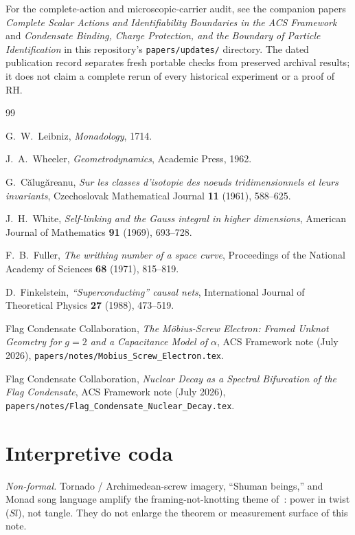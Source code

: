 \documentclass[11pt,a4paper]{article}
\theoremstyle{definition}
\theoremstyle{remark}
\begin{document}
For the complete-action and microscopic-carrier audit, see the companion
papers \emph{Complete Scalar Actions and Identifiability Boundaries in the ACS
Framework} and \emph{Condensate Binding, Charge Protection, and the Boundary
of Particle Identification} in this repository's \texttt{papers/updates/}
directory. The dated publication record separates fresh portable checks
from preserved archival results; it does not claim a complete rerun of every
historical experiment or a proof of RH.

\begin{thebibliography}{99}

G.~W.~Leibniz,
\textit{Monadology},
1714.

J.~A.~Wheeler,
\textit{Geometrodynamics},
Academic Press, 1962.

G.~C\u{a}lug\u{a}reanu,
\textit{Sur les classes d'isotopie des noeuds tridimensionnels et leurs invariants},
Czechoslovak Mathematical Journal \textbf{11} (1961), 588--625.

J.~H.~White,
\textit{Self-linking and the Gauss integral in higher dimensions},
American Journal of Mathematics \textbf{91} (1969), 693--728.

F.~B.~Fuller,
\textit{The writhing number of a space curve},
Proceedings of the National Academy of Sciences \textbf{68} (1971), 815--819.

D.~Finkelstein,
\textit{``Superconducting'' causal nets},
International Journal of Theoretical Physics \textbf{27} (1988), 473--519.

Flag Condensate Collaboration,
\textit{The M\"obius-Screw Electron: Framed Unknot Geometry for $g=2$ and a Capacitance Model of $\alpha$},
ACS Framework note (July 2026),
\nolinkurl{papers/notes/Mobius_Screw_Electron.tex}.

Flag Condensate Collaboration,
\textit{Nuclear Decay as a Spectral Bifurcation of the Flag Condensate},
ACS Framework note (July 2026),
\nolinkurl{papers/notes/Flag_Condensate_Nuclear_Decay.tex}.

\end{thebibliography}

\appendix
\section{Interpretive coda}
\label{app:coda}

\noindent\textit{Non-formal.}  Tornado / Archimedean-screw imagery,
``Shuman beings,'' and Monad song language amplify the framing-not-knotting
theme of~\cite{Mobius2026}: power in twist ($Sl$), not tangle.  They do
not enlarge the theorem or measurement surface of this note.
\end{document}
